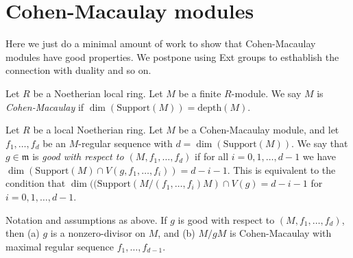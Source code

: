 \section{Cohen-Macaulay modules}
\label{section-CM}

\noindent
Here we just do a minimal amount of work to show that
Cohen-Macaulay modules have good properties. We postpone
using Ext groups to esthablish the connection with duality
and so on.

\begin{definition}
\label{definition-CM}
Let $R$ be a Noetherian local ring.
Let $M$ be a finite $R$-module.
We say $M$ is {\it Cohen-Macaulay}
if $\dim(\text{Support}(M)) = \text{depth}(M)$.
\end{definition}

\noindent
Let $R$ be a local Noetherian ring. Let $M$ be
a Cohen-Macaulay module, and let $f_1, \ldots, f_d$
be an $M$-regular sequence with $d = \dim(\text{Support}(M))$.
We say that $g \in \mathfrak m$ is {\it good with respect to
$(M, f_1, \ldots, f_d)$} if for all $i = 0, 1, \ldots, d-1$
we have $\dim (\text{Support}(M) \cap V(g, f_1, \ldots, f_i))
= d - i - 1$. This is equivalent to the condition that
$\dim((\text{Support}(M/(f_1, \ldots, f_i)M) \cap V(g) =
d - i -1$ for $i = 0, 1, \ldots, d-1$.

\begin{lemma}
\label{lemma-good-element}
Notation and assumptions as above. If $g$ is good with respect to
$(M, f_1, \ldots, f_d)$, then (a) $g$ is a nonzero-divisor on $M$,
and (b) $M/gM$ is Cohen-Macaulay with maximal regular
sequence $f_1, \ldots, f_{d-1}$.
\end{lemma}


